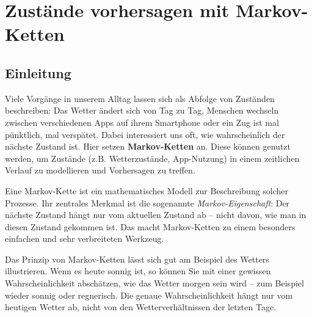 \lstset{style=python}
\chapter{Zustände vorhersagen mit Markov-Ketten}
\label{chap:markov}
\section{Einleitung}

Viele Vorgänge in unserem Alltag lassen sich als Abfolge von Zuständen beschreiben: Das Wetter ändert sich von Tag zu Tag, Menschen wechseln zwischen verschiedenen Apps auf ihrem Smartphone oder ein Zug ist mal pünktlich, mal verspätet. Dabei interessiert uns oft, wie wahrscheinlich der nächste Zustand ist. Hier setzen \textbf{Markov-Ketten} an. Diese können genutzt werden, um Zustände (z.B. Wetterzustände, App-Nutzung) in einem zeitlichen Verlauf zu modellieren und Vorhersagen zu treffen.

Eine Markov-Kette ist ein mathematisches Modell zur Beschreibung solcher Prozesse. Ihr zentrales Merkmal ist die sogenannte \emph{Markov-Eigenschaft}: Der nächste Zustand hängt nur vom aktuellen Zustand ab -- nicht davon, wie man in diesen Zustand gekommen ist. Das macht Markov-Ketten zu einem besonders einfachen und sehr verbreiteten Werkzeug.

Das Prinzip von Markov-Ketten lässt sich gut am Beispiel des Wetters illustrieren. Wenn es heute sonnig ist, so können Sie mit einer gewissen Wahrscheinlichkeit abschätzen, wie das Wetter morgen sein wird -- zum Beispiel wieder sonnig oder regnerisch. Die genaue Wahrscheinlichkeit hängt nur vom heutigen Wetter ab, nicht von den Wetterverhältnissen der letzten Tage.


